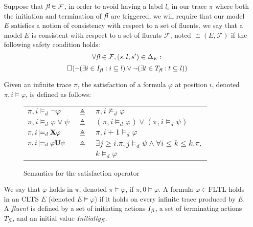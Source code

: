 Suppose that $\emph{fl} \in \mathcal{F}$, in order to avoid having a label $l_i$ in our trace $\pi$ where both the initiation and termination of $\emph{fl}$ are triggered, we will require that our model $E$ satisfies a notion of consistency with respect to a set of fluents, we say that a model $E$ is consistent with respect to a set of fluents $\mathcal{F}$, noted $\cong(E,\mathcal{F})$ if the following safety condition holds: 
\[\forall \emph{fl} \in \mathcal{F}, (s,l,s') \in \Delta_E:\] \[\square(\neg(\exists i \in I_{\emph{fl}}: i \subseteq l) \vee \neg(\exists t \in T_{\emph{fl}}: t \subseteq l))\]



Given an infinite trace $\pi$, the satisfaction of a formula $\varphi$ at position $i$, denoted $\pi,i\models\varphi$, is defined as follows:
\begin{figure}[bt]
\begin{tabular}{ l c l }
	$\pi, i \models_d \neg \varphi$ & $\triangleq$ & $\pi, i \not\models_d \varphi$\\
	$\pi, i \models_d \varphi \vee \psi$ & $\triangleq$ & $(\pi, i \models_d \varphi) \vee (\pi, i \models_d \psi)$\\
	$\pi, i \models_d {\bf X} \varphi$ & $\triangleq$ & $\pi, i +1 \models_d \varphi$\\
	$\pi, i \models_d \varphi {\bf U} \psi$ & $\triangleq$ & $\exists j \geq i . \pi,j \models_d \psi \wedge \forall i \leq k \le k. \pi,$\\
	$ $ & $ $ & $k \models_d \varphi$\\	
\end{tabular}
\caption{Semantics for the satisfaction operator}
\label{fig:back:satisfactionop}
\end{figure}

We say that $\varphi$ holds in $\pi$, denoted $\pi\models\varphi$, if $\pi,0\models\varphi$. 
A formula $\varphi \in \mbox{FLTL}$ holds in an CLTS $E$ (denoted $E \models \varphi$) if it holds on every infinite trace produced by $E$.
A \emph{fluent} \fluent \space is defined by a set of initiating actions $I_{\emph{fl}}$, a set of terminating actions $T_{\emph{fl}}$, and an initial value \emph{Initially}$_{\emph{fl}}$.

